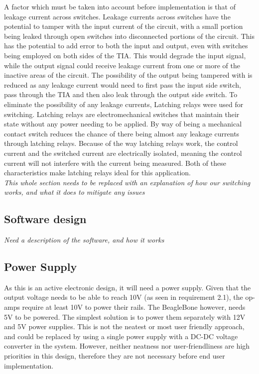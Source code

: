 \documentclass[conference]{IEEEtran}
\begin{document}
A factor which must be taken into account before implementation is that of leakage current across switches. Leakage currents across switches have the potential to tamper with the input current of the circuit, with a small portion being leaked through open switches into disconnected portions of the circuit. This has the potential to add error to both the input and output, even with switches being employed on both sides of the TIA. This would degrade the input signal, while the output signal could receive leakage current from one or more of the inactive areas of the circuit. The possibility of the output being tampered with is reduced as any leakage current would need to first pass the input side switch, pass through the TIA and then also leak through the output side switch.
To eliminate the possibility of any leakage currents, Latching relays were used for switching. Latching relays are electromechanical switches that maintain their state without any power needing to be applied. By way of being a mechanical contact switch reduces the chance of there being almost any leakage currents through latching relays. Because of the way latching relays work, the control current and the switched current are electrically isolated, meaning the control current will not interfere with the current being measured. Both of these characteristics make latching relays ideal for this application.\\

\textit{This whole section needs to be replaced with an explanation of how our switching works, and what it does to mitigate any issues} \\

\subsection{Software design}

\textit{Need a description of the software, and how it works}

\subsection{Power Supply}

As this is an active electronic design, it will need a power supply. Given that the output voltage needs to be able to reach 10V (as seen in requirement 2.1), the op-amps require at least 10V to power their rails. The BeagleBone however, needs 5V to be powered. The simplest solution is to power them separately with 12V and 5V power supplies. This is not the neatest or most user friendly approach, and could be replaced by using a single power supply with a DC-DC voltage converter in the system. However, neither neatness nor user-friendliness are high priorities in this design, therefore they are not necessary before end user implementation. \\
\end{document}
